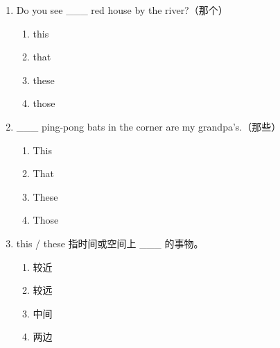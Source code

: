 \documentclass[11pt,a4paper]{ctexart}
\begin{document}
\begin{enumerate}[leftmargin=*,itemsep=4pt]
\begin{enumerate}[label=\Alph*.,leftmargin=2em,itemsep=1pt,topsep=2pt]
\end{enumerate}
\item Do you see \_\_\_ red house by the river?（那个）
\begin{enumerate}[label=\Alph*.,leftmargin=2em,itemsep=1pt,topsep=2pt]
\item this
\item that
\item these
\item those
\end{enumerate}
\item \_\_\_ ping-pong bats in the corner are my grandpa’s.（那些）
\begin{enumerate}[label=\Alph*.,leftmargin=2em,itemsep=1pt,topsep=2pt]
\item This
\item That
\item These
\item Those
\end{enumerate}
\item this / these 指时间或空间上 \_\_\_ 的事物。
\begin{enumerate}[label=\Alph*.,leftmargin=2em,itemsep=1pt,topsep=2pt]
\item 较近
\item 较远
\item 中间
\item 两边
\end{enumerate}
\end{enumerate}
\end{document}
